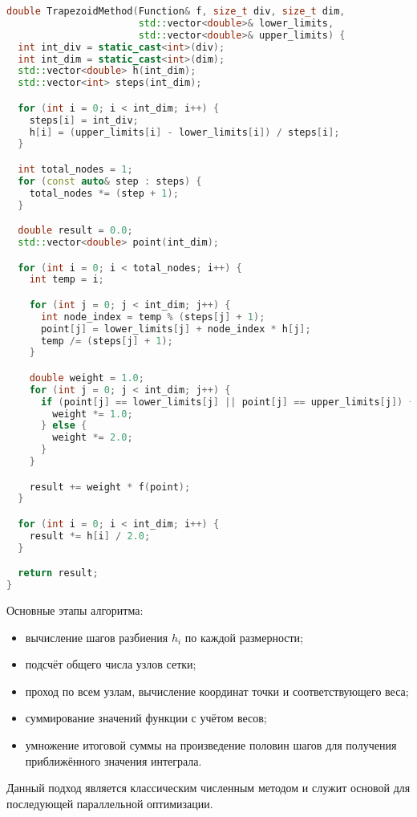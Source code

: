 \documentclass[a4paper,14pt]{article}
\begin{document}
\begin{lstlisting}[language=C++]
double TrapezoidMethod(Function& f, size_t div, size_t dim,
                       std::vector<double>& lower_limits,
                       std::vector<double>& upper_limits) {
  int int_div = static_cast<int>(div);
  int int_dim = static_cast<int>(dim);
  std::vector<double> h(int_dim);
  std::vector<int> steps(int_dim);

  for (int i = 0; i < int_dim; i++) {
    steps[i] = int_div;
    h[i] = (upper_limits[i] - lower_limits[i]) / steps[i];
  }

  int total_nodes = 1;
  for (const auto& step : steps) {
    total_nodes *= (step + 1);
  }

  double result = 0.0;
  std::vector<double> point(int_dim);

  for (int i = 0; i < total_nodes; i++) {
    int temp = i;

    for (int j = 0; j < int_dim; j++) {
      int node_index = temp % (steps[j] + 1);
      point[j] = lower_limits[j] + node_index * h[j];
      temp /= (steps[j] + 1);
    }

    double weight = 1.0;
    for (int j = 0; j < int_dim; j++) {
      if (point[j] == lower_limits[j] || point[j] == upper_limits[j]) {
        weight *= 1.0;
      } else {
        weight *= 2.0;
      }
    }

    result += weight * f(point);
  }

  for (int i = 0; i < int_dim; i++) {
    result *= h[i] / 2.0;
  }

  return result;
}
\end{lstlisting}

Основные этапы алгоритма:
\begin{itemize}
    \item вычисление шагов разбиения $h_i$ по каждой размерности;
    \item подсчёт общего числа узлов сетки;
    \item проход по всем узлам, вычисление координат точки и соответствующего веса;
    \item суммирование значений функции с учётом весов;
    \item умножение итоговой суммы на произведение половин шагов для получения приближённого значения интеграла.
\end{itemize}

Данный подход является классическим численным методом и служит основой для последующей параллельной оптимизации.
\end{document}
